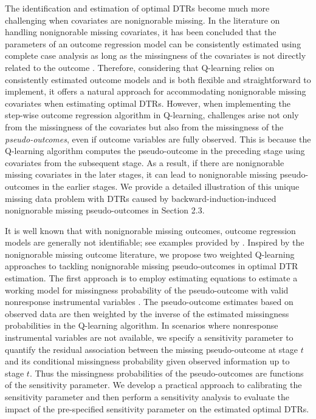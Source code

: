\documentclass[12pt]{article}
\begin{document}
The identification and estimation of optimal DTRs become much more challenging when covariates are nonignorable missing. In the literature on handling  nonignorable missing covariates, it has been concluded that the parameters of an outcome regression model can be consistently estimated using complete case analysis as long as the missingness of the covariates is not directly related to the outcome \citep{Yang_Wang_Ding_2019}. Therefore, considering that Q-learning relies on consistently estimated outcome models and is both flexible and straightforward to implement, it offers a natural approach for accommodating nonignorable missing covariates when estimating optimal DTRs. 
However, when implementing the step-wise outcome regression algorithm in  Q-learning,  challenges arise not only from the missingness of the covariates but also from the missingness of the \emph{pseudo-outcomes}, even if  outcome variables are fully observed. This is because the Q-learning algorithm computes the pseudo-outcome in the preceding stage using covariates from the subsequent stage. As a result, if there are nonignorable missing covariates in the later stages, it can lead to nonignorable missing pseudo-outcomes in the earlier stages.  We provide a detailed illustration of this unique missing data problem with DTRs caused by backward-induction-induced nonignorable missing pseudo-outcomes in Section 2.3. 

It is well known that with nonignorable missing outcomes, outcome regression models are generally not identifiable; see examples provided by \cite{Miao_Ding_Geng_2016}. Inspired by the nonignorable missing outcome literature, we propose two weighted Q-learning approaches to tackling nonignorable missing  pseudo-outcomes in optimal DTR estimation. The first approach is to employ estimating equations to estimate a working model for missingness probability of the pseudo-outcome with valid nonresponse instrumental variables  \citep{Shao_Wang_2016}.  The pseudo-outcome estimates based on observed data are then weighted by the inverse of the estimated missingness probabilities in the Q-learning algorithm. In scenarios where nonresponse instrumental variables are not available, we specify a sensitivity parameter to quantify the residual association between the missing pseudo-outcome at stage $t$ and its conditional missingness probability given observed information up to stage $t$. Thus the missingness probabilities of the pseudo-outcomes are functions of the sensitivity parameter. We develop a practical approach to calibrating the sensitivity parameter  and then perform a sensitivity analysis to evaluate the impact of the pre-specified sensitivity parameter on the estimated optimal DTRs.
\end{document}
